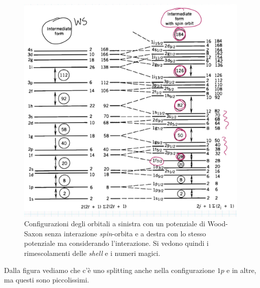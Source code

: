 \begin{figure}[h]
    \centering
    \includegraphics[scale=0.3]{Immagini/shell2.png}
    \caption{Configurazioni degli orbitali a sinistra con un potenziale di Wood-Saxon senza interazione \textit{spin}-orbita e a destra con lo stesso potenziale ma considerando l'interazione. Si vedono quindi i rimescolamenti delle \textit{shell} e i numeri magici.}
    \label{shellmix}
\end{figure}
\noindent Dalla figura vediamo che c'è uno splitting anche nella configurazione $1p$ e in altre, ma questi sono piccolissimi.

